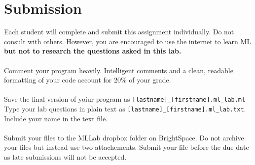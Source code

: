 \documentclass{article}
\begin{document}
\section*{Submission}
Each student will complete and submit this assignment individually. Do not consult with others. However, you are encouraged to use the internet to learn ML \textbf{but not to research the questions asked in this lab.}
\\\\
Comment your program heavily. Intelligent comments and a clean, readable formatting of your code account for 20\% of your grade.
\\\\
Save the final version of yoiur program as \verb|[lastname]_[firstname].ml_lab.ml| Type your lab questions in plain text as \verb|[lastname]_[firstname].ml_lab.txt|. Include your name in the text file.
\\\\
Submit your files to the MLLab dropbox folder on BrightSpace. Do not archive your files but instead use two attachements. Submit your file before the due date as late submissions will not be accepted.
\end{document}
